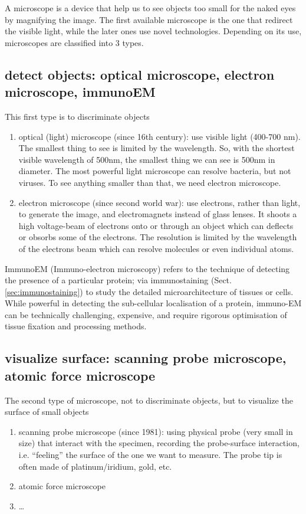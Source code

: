A microscope is a device that help us to see objects too small for the naked
eyes by magnifying the image. The first available microscope is the one that
redirect the visible light, while the later ones use novel technologies.
Depending on its use, microscopes are classified into 3 types.

\subsection{detect objects: optical microscope, electron microscope, immunoEM}

This first type is to discriminate objects
\begin{enumerate}
  \item optical (light) microscope (since 16th century): use visible light
  (400-700 nm). The smallest thing to see is limited by the wavelength. So, with
  the shortest visible wavelength of 500nm, the smallest thing we can see is
  500nm in diameter. The most powerful light microscope can resolve bacteria,
  but not viruses. To see anything smaller than that, we need electron
  microscope. 

  \item electron microscope (since second world war): use electrons, rather than
  light, to generate the image, and electromagnets instead of glass lenses. It
  shoots a high voltage-beam of electrons onto or through an object which can
  deflects or obsorbs some of the electrons. The resolution is limited by the
  wavelength of the electrons beam which can resolve molecules or even
  individual atoms. 
\end{enumerate}

ImmunoEM (Immuno-electron microscopy) refers to the technique of detecting the
presence of a particular protein; via immunostaining
(Sect.\ref{sec:immunostaining}) to study the detailed microarchitecture of
tissues or cells.
While powerful in detecting the sub-cellular localisation of a protein,
immuno-EM can be technically challenging, expensive, and require rigorous
optimisation of tissue fixation and processing methods.



\subsection{visualize surface: scanning probe microscope, atomic force
microscope}

The second type of microscope, not to discriminate objects, but to visualize the
surface of small objects
\begin{enumerate}
  \item scanning probe microscope (since 1981): using physical probe (very
  small in size) that interact with the specimen, recording the probe-surface
  interaction, i.e. ``feeling'' the surface of the one we want to measure. The
  probe tip is often made of platinum/iridium, gold, etc. 
  \item atomic force microscope
  \item \ldots
\end{enumerate}

